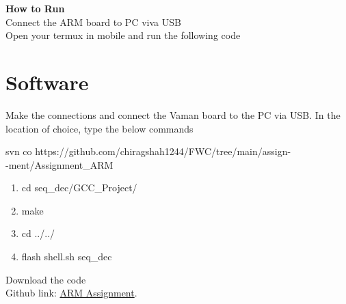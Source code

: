 \documentclass[10pt,a4paper]{report}
\begin{document}
\begin{multicols}{2}
\vspace{2mm}\textbf{How to Run}\\\vspace{2mm}
Connect the ARM board to PC viva USB \\
Open your termux in mobile and run the following code\\

\section*{\large Software}
Make the connections and connect the Vaman board to the PC via USB. In the location of choice, type the below commands\\ \vspace{2mm}

 svn co https://github.com/chiragshah1244/FWC/tree/main/assign-\\ \vspace{-4mm}-ment/Assignment\_ARM
 \begin{enumerate}
\item cd seq\_dec/GCC\_Project/
\item make
\item cd ../../ 
\item flash shell.sh seq\_dec
\end{enumerate}
\raggedright  Download the code \\
Github link: \href{https://github.com/chiragshah1244/FWC/blob/main/assignments/Assignment_ARM/seq_dec/src/main.c}{ARM Assignment}.

  \end{multicols}
\end{document}
